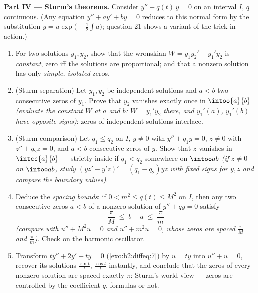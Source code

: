 \begin{problem}
\medskip
\noindent\textbf{Part IV --- Sturm's theorems.} Consider $y''
+ q(t)\,y = 0$ on an interval $I$, $q$ continuous. (Any
equation $y'' + ay' + by = 0$ reduces to this normal form by
the substitution $y = u\exp\bigl(-\frac12\int a\bigr)$;
question 21 shows a variant of the trick in action.)
\begin{enumerate}[resume]
  \item For two solutions $y_1, y_2$, show that the wronskian
        $W = y_1y_2' - y_1'y_2$ is \emph{constant}, zero iff
        the solutions are proportional; and that a nonzero
        solution has only \emph{simple, isolated} zeros.
  \item (Sturm separation) Let $y_1, y_2$ be independent
        solutions and $a < b$ two consecutive zeros of $y_1$.
        Prove that $y_2$ vanishes exactly once in
        $\intoo{a}{b}$ \emph{(evaluate the constant $W$ at $a$
        and $b$: $W = y_1'y_2$ there, and $y_1'(a)$,
        $y_1'(b)$ have opposite signs)}: zeros of independent
        solutions interlace.
  \item (Sturm comparison) Let $q_1 \leq q_2$ on $I$, $y \neq
        0$ with $y'' + q_1y = 0$, $z \neq 0$ with $z'' + q_2z
        = 0$, and $a < b$ consecutive zeros of $y$. Show that
        $z$ vanishes in $\intcc{a}{b}$ --- strictly inside if
        $q_1 < q_2$ somewhere on $\intoo ab$ \emph{(if $z \neq
        0$ on $\intoo ab$, study $(yz' - y'z)' = (q_1 -
        q_2)yz$ with fixed signs for $y, z$ and compare the
        boundary values)}.
  \item Deduce the \emph{spacing bounds}: if $0 < m^2 \leq
        q(t) \leq M^2$ on $I$, then any two consecutive zeros
        $a < b$ of a nonzero solution of $y'' + qy = 0$
        satisfy
        \[
        \frac{\pi}{M} \;\leq\; b - a \;\leq\; \frac{\pi}{m}
        \]
        \emph{(compare with $u'' + M^2u = 0$ and $u'' + m^2u
        = 0$, whose zeros are spaced $\frac\pi M$ and
        $\frac\pi m$)}. Check on the harmonic oscillator.
  \item Transform $ty'' + 2y' + ty = 0$
        (\cref{exo:b2:diffeq:7}) by $u = ty$ into $u'' + u =
        0$, recover its solutions $\frac{\sin t}t$,
        $\frac{\cos t}{t}$ instantly, and conclude that the
        zeros of every nonzero solution are spaced exactly
        $\pi$: Sturm's world view --- zeros are controlled by
        the coefficient $q$, formulas or not.
\end{enumerate}


\end{problem}
